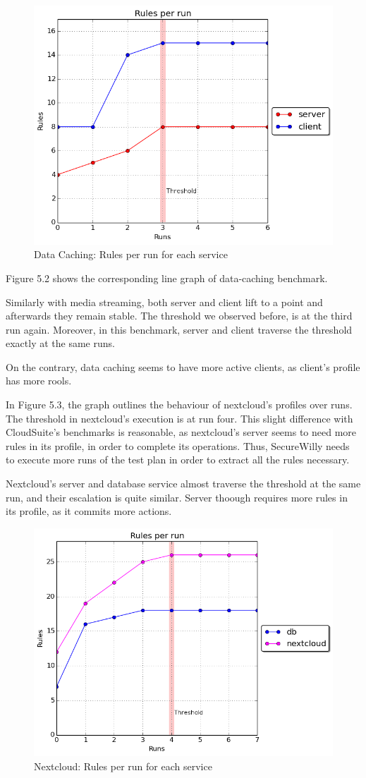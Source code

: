 \begin{figure}[h!]
  \centering
   \includegraphics[width=0.70\linewidth]{./figures/datacaching/rulesthreshold.png}
   \caption{Data Caching: Rules per run for each service}
\end{figure}

Figure 5.2 shows the corresponding line graph of data-caching benchmark.

Similarly with media streaming, both server and client lift to a point and afterwards they remain stable. The threshold we observed before, is at the third run again. Moreover, in this benchmark, server and client traverse the threshold exactly at the same runs.

On the contrary, data caching seems to have more active clients, as client's profile has more rools.

In Figure 5.3, the graph outlines the behaviour of nextcloud's profiles over runs. The threshold in nextcloud's execution is at run four. This slight difference with CloudSuite's benchmarks is reasonable, as nextcloud's server seems to need more rules in its profile, in order to complete its operations. Thus, SecureWilly needs to execute more runs of the test plan in order to extract all the rules necessary.

Nextcloud's server and database service almost traverse the threshold at the same run, and their escalation is quite similar. Server thoough requires more rules in its profile, as it commits more actions.

\begin{figure}[h!]
  \centering
   \includegraphics[width=0.75\linewidth]{./figures/nextcloud/rulesthreshold.png}
   \caption{Nextcloud: Rules per run for each service}
\end{figure}
\hfill\break

